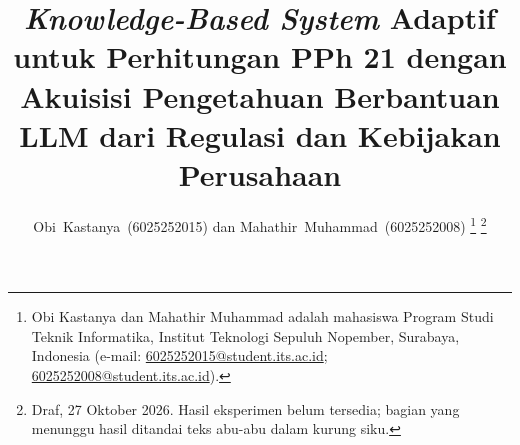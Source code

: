 \documentclass[journal,a4paper]{IEEEtran}
\newcommand{\en}[1]{\textit{#1}}
\begin{document}
\title{\en{Knowledge-Based System} Adaptif untuk Perhitungan PPh 21 dengan Akuisisi Pengetahuan Berbantuan LLM dari Regulasi dan Kebijakan Perusahaan}
\author{Obi~Kastanya~(6025252015) dan Mahathir~Muhammad~(6025252008)%
\thanks{Obi Kastanya dan Mahathir Muhammad adalah mahasiswa Program Studi Teknik Informatika, Institut Teknologi Sepuluh Nopember, Surabaya, Indonesia (e-mail: \url{6025252015@student.its.ac.id}; \url{6025252008@student.its.ac.id}).}%
\thanks{Draf, 27 Oktober 2026. Hasil eksperimen belum tersedia; bagian yang menunggu hasil ditandai teks abu-abu dalam kurung siku.}}
\maketitle













\end{document}
